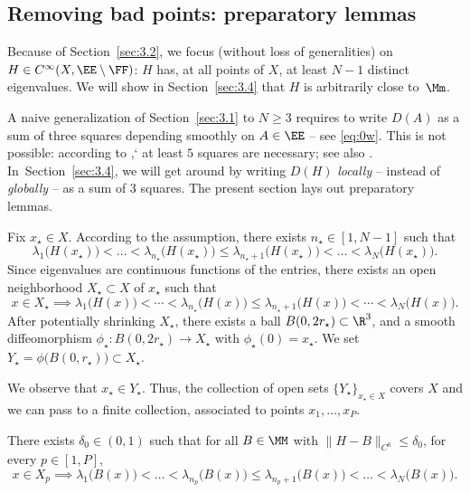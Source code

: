 \subsection{Removing bad points: preparatory lemmas}\label{sec:3.3} Because of Section~\ref{sec:3.2}, we focus (without loss of generalities) on $H \in C^\infty(X, \EE\setminus \FF)$: $H$ has, at all points of $X$, at least $N-1$ distinct eigenvalues. We will show in Section~\ref{sec:3.4} that $H$ is arbitrarily close to~$\Mm$.

A naive generalization of Section~\ref{sec:3.1} to $N \geq 3$ requires to write $D(A)$ as a sum of three squares depending smoothly on $A \in \EE$ -- see \eqref{eq:0w}. This is not possible: according to \cite{D11},` at least $5$ squares are necessary; see also \cite{I92,L98,P02,D11}. In~Section~\ref{sec:3.4}, we will get around by writing $D(H)$ \textit{locally} -- instead of \textit{globally} -- as a sum of $3$ squares. The present section lays out preparatory lemmas.

Fix $x_\star \in X$. According to the assumption, there exists $n_\star \in [1,N-1]$ such that
\begin{equation*}
\lambda_1\bigl( H(x_\star) \bigr) < \dots < \lambda_{n_\star}\bigl( H(x_\star) \bigr) \leq \lambda_{n_\star+1}\bigl( H(x_\star) \bigr) < \dots < \lambda_N\bigl( H(x_\star) \bigr).
\end{equation*}
Since eigenvalues are continuous functions of the entries, there exists an open neighborhood $X_\star \subset X$ of $x_\star$ such that
\begin{equation}\label{eq:2c}
x \in X_\star \implies
\lambda_1\bigl( H(x) \bigr) \!<\! \cdots \!<\! \lambda_{n_\star}\bigl( H(x) \bigr) \!\leq\! \lambda_{n_\star+1}\bigl( H(x) \bigr) \!<\! \cdots \!<\! \lambda_N\bigl( H(x) \bigr).
\end{equation}
After potentially shrinking $X_\star$, there exists a ball $B(0,2r_\star) \subset \R^3$, and a smooth diffeomorphism $\phi_\star : B(0,2r_\star) \to X_\star$ with $\phi_\star(0) = x_\star$. We set $Y_\star = \phi\bigl(B(0,r_\star)\bigr) \subset X_\star$.

We observe that $x_\star \in Y_\star$. Thus, the collection of open sets $\{ Y_\star \}_{x_\star \in X}$ covers $X$ and we can pass to a finite collection, associated to points $x_1, \dots, x_P$.

\begin{lem}\label{lem:1b} There exists $\delta_0 \in (0,1)$ such that for all $B \in \MM$ with $\| H-B\|_{C^0} \leq \delta_0$, for every $p \in [1,P]$,
\begin{equation*}
x \in X_p \implies
\lambda_1\bigl( B(x) \bigr) < \dots < \lambda_{n_p}\bigl( B(x) \bigr) \leq \lambda_{n_p+1}\bigl( B(x) \bigr) < \dots < \lambda_N\bigl( B(x) \bigr).
\end{equation*}
\end{lem}

